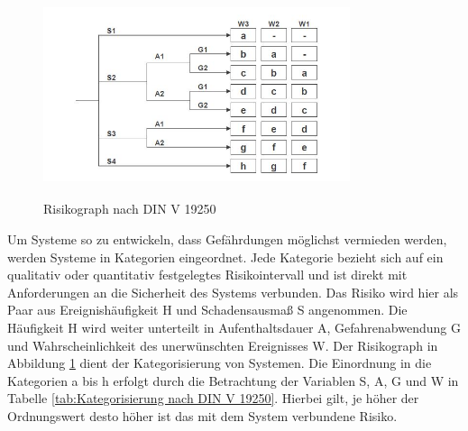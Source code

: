 \begin{savenotes}
	\begin{figure}[H]
		\centering
		\includegraphics[width=9cm,height=6cm]{figures/Risikograph}
		\caption[Risikograph nach DIN V 1925]{Risikograph nach DIN V 19250 \parencite[S. 51]{Hillenbrand.2012}}\label{fig:Risikograph}
	\end{figure}
\end{savenotes}

Um Systeme so zu entwickeln, dass Gefährdungen möglichst vermieden werden, werden Systeme in Kategorien eingeordnet. Jede Kategorie bezieht sich auf ein qualitativ oder quantitativ festgelegtes Risikointervall und ist direkt mit Anforderungen an die Sicherheit des Systems verbunden. Das Risiko wird hier als Paar aus Ereignishäufigkeit H und Schadensausmaß S angenommen. Die Häufigkeit H wird weiter unterteilt in Aufenthaltsdauer A, Gefahrenabwendung G und Wahrscheinlichkeit des unerwünschten Ereignisses W. Der Risikograph in Abbildung \ref{fig:Risikograph} dient der Kategorisierung von Systemen. Die Einordnung in die Kategorien a bis h erfolgt durch die Betrachtung der Variablen S, A, G und W in Tabelle \ref{tab:Kategorisierung nach DIN V 19250}. Hierbei gilt, je höher der Ordnungswert desto höher ist das mit dem System verbundene Risiko.

